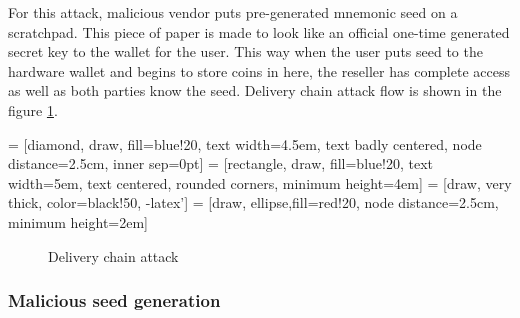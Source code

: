 \documentclass[
  printed, %
  table,   %
  nolof,     %
  nolot,     %
           oneside, color
]{fithesis3}
\begin{document}
For this attack, malicious vendor puts pre-generated mnemonic seed on a scratchpad. This piece of paper is made to look like an official one-time generated secret key to the wallet for the user. This way when the user puts seed to the hardware wallet and begins to store coins in here, the reseller has complete access as well as both parties know the seed. Delivery chain attack flow is shown in the figure \ref{pict:delivery-chain-attack}.

 = [diamond, draw, fill=blue!20,
    text width=4.5em, text badly centered, node distance=2.5cm, inner sep=0pt]
 = [rectangle, draw, fill=blue!20,
    text width=5em, text centered, rounded corners, minimum height=4em]
 = [draw, very thick, color=black!50, -latex']
 = [draw, ellipse,fill=red!20, node distance=2.5cm,
    minimum height=2em]
\begin{figure}[H]
\center
{}
\caption{Delivery chain attack}
\label{pict:delivery-chain-attack}
\end{figure}
\subsubsection{Malicious seed generation}
\end{document}
